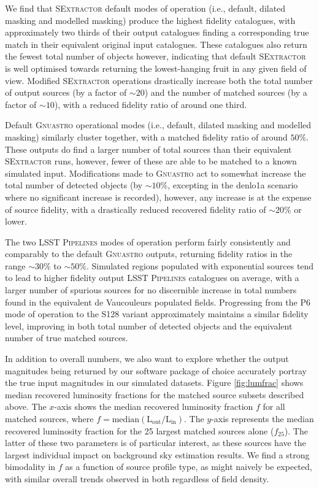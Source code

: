 \documentclass[fleqn,usenatbib,useAMS]{mnras}
\newcommand*{\about}{\mathord\sim}
\newcommand*{\SExtractor}{\textsc{SExtractor}\xspace}
\newcommand*{\Gnuastro}{\textsc{Gnuastro}\xspace}
\newcommand*{\LSSTPs}{\textsc{LSST Pipelines}\xspace}
\newcommand*{\DMA}{\textsc{P6}\xspace}
\newcommand*{\DMB}{\textsc{S128}\xspace}
\begin{document}
We find that \SExtractor default modes of operation (i.e., default, dilated masking and modelled masking) produce the highest fidelity catalogues, with approximately two thirds of their output catalogues finding a corresponding true match in their equivalent original input catalogues. These catalogues also return the fewest total number of objects however, indicating that default \SExtractor is well optimised towards returning the lowest-hanging fruit in any given field of view. Modified \SExtractor operations drastically increase both the total number of output sources (by a factor of $\about20$) and the number of matched sources (by a factor of $\about10$), with a reduced fidelity ratio of around one third.

Default \Gnuastro operational modes (i.e., default, dilated masking and modelled masking) similarly cluster together, with a matched fidelity ratio of around $50\%$. These outputs do find a larger number of total sources than their equivalent \SExtractor runs, however, fewer of these are able to be matched to a known simulated input. Modifications made to \Gnuastro act to somewhat increase the total number of detected objects (by $\about10\%$, excepting in the denlo1a scenario where no significant increase is recorded), however, any increase is at the expense of source fidelity, with a drastically reduced recovered fidelity ratio of $\about20\%$ or lower.

The two \LSSTPs modes of operation perform fairly consistently and comparably to the default \Gnuastro outputs, returning fidelity ratios in the range $\about30\%$ to $\about50\%$. Simulated regions populated with exponential sources tend to lead to higher fidelity output \LSSTPs catalogues on average, with a larger number of spurious sources for no discernible increase in total numbers found in the equivalent de Vaucouleurs populated fields. Progressing from the \DMA mode of operation to the \DMB variant approximately maintains a similar fidelity level, improving in both total number of detected objects and the equivalent number of true matched sources.

In addition to overall numbers, we also want to explore whether the output magnitudes being returned by our software package of choice accurately portray the true input magnitudes in our simulated datasets. Figure \ref{fig:lumfrac} shows median recovered luminosity fractions for the matched source subsets described above. The $x$-axis shows the median recovered luminosity fraction $f$ for all matched sources, where $f=\mathrm{median}(\mathrm{L}_{\mathrm{out}}/\mathrm{L}_{\mathrm{in}})$. The $y$-axis represents the median recovered luminosity fraction for the 25 largest matched sources alone ($f_{25}$). The latter of these two parameters is of particular interest, as these sources have the largest individual impact on background sky estimation results. We find a strong bimodality in $f$ as a function of source profile type, as might naively be expected, with similar overall trends observed in both regardless of field density. 
\end{document}
